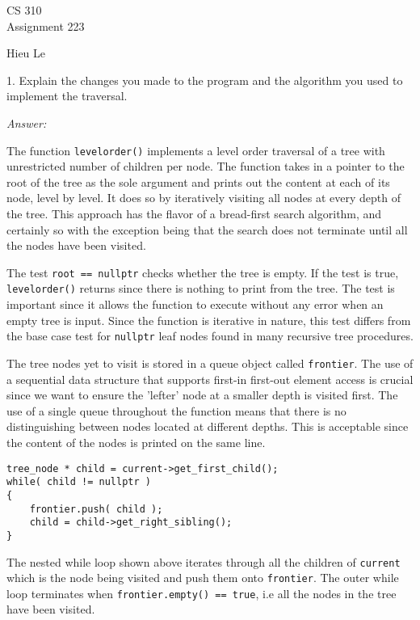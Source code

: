 \documentclass[12pt]{article}
\begin{document}
\thispagestyle{empty}

\begin{center}
{\large CS 310}\\
Assignment 223
\end{center}

\begin{flushright}
Hieu Le
\end{flushright}

1. Explain the changes you made to the program and
the algorithm you used to implement the traversal.

\textit{Answer:}

The function \texttt{levelorder()} implements a level order traversal of a tree 
with unrestricted number of children per node. The function takes in a pointer 
to the root of the tree as the sole argument and prints out the content at each 
of its node, level by level. It does so by iteratively visiting all nodes at 
every depth of the tree. This approach has the flavor of a bread-first search 
algorithm, and certainly so with the exception being that the search does not 
terminate until all the nodes have been visited.

The test \texttt{root == nullptr} checks whether the tree is empty. If the test
is true, \texttt{levelorder()} returns since there is nothing to print from the 
tree. The test is important since it allows the function to execute without any
error when an empty tree is input. Since the function is iterative in nature,
this test differs from the base case test for \texttt{nullptr} leaf nodes found 
in many recursive tree procedures.

The tree nodes yet to visit is stored in a queue object called \texttt{frontier}. The
use of a sequential data structure that supports first-in first-out element access
is crucial since we want to ensure the 'lefter' node at a smaller depth is visited
first. The use of a single queue throughout the function means that there is no 
distinguishing between nodes located at different depths. This is acceptable since
the content of the nodes is printed on the same line. 

\begin{verbatim}
tree_node * child = current->get_first_child();
while( child != nullptr )
{
    frontier.push( child );
    child = child->get_right_sibling();
}
\end{verbatim}

The nested while loop shown above iterates through all the children of 
\texttt{current} which is the node being visited and push them onto \texttt{frontier}. 
The outer while loop terminates when \texttt{frontier.empty() == true}, i.e all the 
nodes in the tree have been visited.
\end{document}
